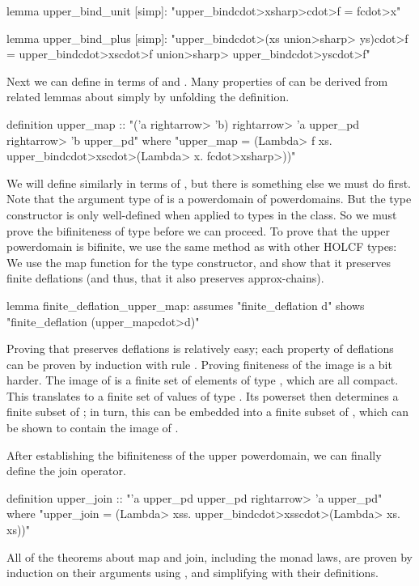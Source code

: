 \begin{isacode}
lemma upper_bind_unit [simp]:
  "upper_bind\<cdot>{x}\<sharp>\<cdot>f = f\<cdot>x"
\end{isacode}
\unmedskip
{}
\begin{isacode}
lemma upper_bind_plus [simp]:
  "upper_bind\<cdot>(xs \<union>\<sharp> ys)\<cdot>f = upper_bind\<cdot>xs\<cdot>f \<union>\<sharp> upper_bind\<cdot>ys\<cdot>f"
\end{isacode}
%
Next we can define  in terms of  and . Many properties of  can be derived from related lemmas about  simply by unfolding the definition.
%
\begin{isacode}
definition upper_map :: "('a \<rightarrow> 'b) \<rightarrow> 'a upper_pd \<rightarrow> 'b upper_pd"
  where "upper_map = (\<Lambda> f xs. upper_bind\<cdot>xs\<cdot>(\<Lambda> x. {f\<cdot>x}\<sharp>))"
\end{isacode}
%
We will define  similarly in terms of , but there is something else we must do first. Note that the argument type of  is a powerdomain of powerdomains. But the type constructor  is only well-defined when applied to types in the  class. So we must prove the bifiniteness of type  before we can proceed.
%
To prove that the upper powerdomain is bifinite, we use the same method as with other HOLCF types: We use the map function for the type constructor, and show that it preserves finite deflations (and thus, that it also preserves approx-chains).
%
\begin{isacode}
lemma finite_deflation_upper_map:
  assumes "finite_deflation d" shows "finite_deflation (upper_map\<cdot>d)"
\end{isacode}
%
Proving that  preserves deflations is relatively easy; each property of deflations can be proven by induction with rule . Proving finiteness of the image is a bit harder. The image of  is a finite set of elements of type , which are all compact. This translates to a finite set of values of type . Its powerset then determines a finite subset of ; in turn, this can be embedded into a finite subset of , which can be shown to contain the image of .

After establishing the bifiniteness of the upper powerdomain, we can finally define the join operator.
%
\begin{isacode}
definition upper_join :: "'a upper_pd upper_pd \<rightarrow> 'a upper_pd"
  where "upper_join = (\<Lambda> xss. upper_bind\<cdot>xss\<cdot>(\<Lambda> xs. xs))"
\end{isacode}
%
All of the theorems about map and join, including the monad laws, are proven by induction on their arguments using , and simplifying with their definitions.


